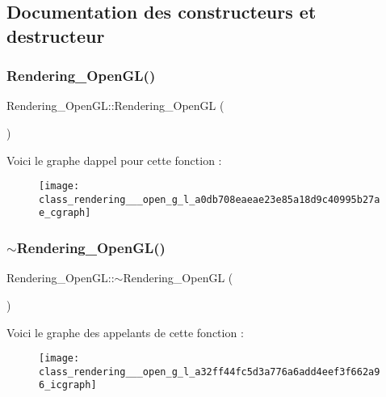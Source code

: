 \subsection{Documentation des constructeurs et destructeur}
\mbox{\label{class_rendering___open_g_l_a0db708eaeae23e85a18d9c40995b27ae}} 
\subsubsection{\texorpdfstring{Rendering\+\_\+\+Open\+G\+L()}{Rendering\_OpenGL()}}
{\footnotesize\ttfamily Rendering\+\_\+\+Open\+G\+L\+::\+Rendering\+\_\+\+Open\+GL (\begin{DoxyParamCaption}{ }\end{DoxyParamCaption})\hspace{0.3cm}{\ttfamily [inline]}}

Voici le graphe d\textquotesingle{}appel pour cette fonction \+:\nopagebreak
\begin{figure}[H]
\begin{center}
\leavevmode
\texttt{[image: class\_rendering\_\_\_open\_g\_l\_a0db708eaeae23e85a18d9c40995b27ae\_cgraph]}
\end{center}
\end{figure}
\mbox{\label{class_rendering___open_g_l_a32ff44fc5d3a776a6add4eef3f662a96}} 
\subsubsection{\texorpdfstring{$\sim$\+Rendering\+\_\+\+Open\+G\+L()}{~Rendering\_OpenGL()}}
{\footnotesize\ttfamily Rendering\+\_\+\+Open\+G\+L\+::$\sim$\+Rendering\+\_\+\+Open\+GL (\begin{DoxyParamCaption}{ }\end{DoxyParamCaption})}

Voici le graphe des appelants de cette fonction \+:\nopagebreak
\begin{figure}[H]
\begin{center}
\leavevmode
\texttt{[image: class\_rendering\_\_\_open\_g\_l\_a32ff44fc5d3a776a6add4eef3f662a96\_icgraph]}
\end{center}
\end{figure}


